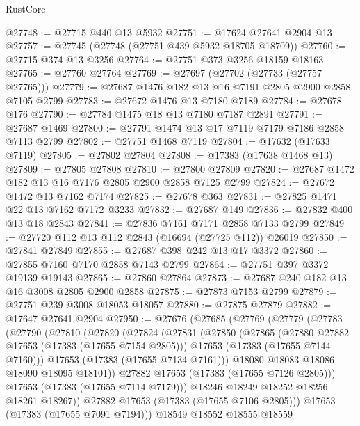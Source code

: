 \begin{lexlean}{RustCore}
\begin{coremodule}
@27748 := @27715 @440 @13 @5932
@27751 := @17624 @27641 @2904 @13
@27757 := @27745 (@27748 (@27751 @439 @5932 @18705 @18709))
@27760 := @27715 @374 @13 @3256
@27764 := @27751 @373 @3256 @18159 @18163
@27765 := @27760 @27764
@27769 := @27697 (@27702 (@27733 (@27757 @27765)))
@27779 := @27687 @1476 @182 @13 @16 @7191 @2805 @2900 @2858 @7105 @2799
@27783 := @27672 @1476 @13 @7180 @7189
@27784 := @27678 @176
@27790 := @27784 @1475 @18 @13 @7180 @7187 @2891
@27791 := @27687 @1469
@27800 := @27791 @1474 @13 @17 @7119 @7179 @7186 @2858 @7113 @2799
@27802 := @27751 @1468 @7119
@27804 := @17632 (@17633 @7119)
@27805 := @27802 @27804
@27808 := @17383 (@17638 @1468 @13)
@27809 := @27805 @27808
@27810 := @27800 @27809
@27820 := @27687 @1472 @182 @13 @16 @7176 @2805 @2900 @2858 @7125 @2799
@27824 := @27672 @1472 @13 @7162 @7174
@27825 := @27678 @363
@27831 := @27825 @1471 @22 @13 @7162 @7172 @3233
@27832 := @27687 @149
@27836 := @27832 @400 @13 @18 @2843
@27841 := @27836 @7161 @7171 @2858 @7133 @2799
@27849 := @27720 @112 @13 @112 @2843 (@16694 (@27725 @112)) @26019
@27850 := @27841 @27849
@27855 := @27687 @398 @242 @13 @17 @3372
@27860 := @27855 @7160 @7170 @2858 @7143 @2799
@27864 := @27751 @397 @3372 @19139 @19143
@27865 := @27860 @27864
@27873 := @27687 @240 @182 @13 @16 @3008 @2805 @2900 @2858
@27875 := @27873 @7153 @2799
@27879 := @27751 @239 @3008 @18053 @18057
@27880 := @27875 @27879
@27882 := @17647 @27641 @2904
@27950 := @27676
    (@27685
      (@27769
        (@27779
          (@27783
            (@27790
              (@27810
                (@27820
                  (@27824
                    (@27831
                      (@27850
                        (@27865
                          (@27880 @27882 @17653 (@17383 (@17655 @7154 @2805)))
                          @17653
                          (@17383 (@17655 @7144 @7160)))
                        @17653
                        (@17383 (@17655 @7134 @7161)))
                      @18080
                      @18083
                      @18086
                      @18090
                      @18095
                      @18101))
                  @27882
                  @17653
                  (@17383 (@17655 @7126 @2805)))
                @17653
                (@17383 (@17655 @7114 @7179)))
              @18246
              @18249
              @18252
              @18256
              @18261
              @18267))
          @27882
          @17653
          (@17383 (@17655 @7106 @2805)))
        @17653
        (@17383 (@17655 @7091 @7194)))
      @18549
      @18552
      @18555
      @18559

\end{coremodule}
\end{lexlean}
